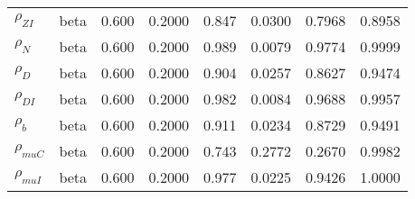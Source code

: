 \begin{center}
\begin{longtable}{llcccccc}
${\rho_{ZI}}$ & beta &   0.600 & 0.2000 &   0.847& 0.0300 &  0.7968 &  0.8958 \\ 
${\rho_N}$ & beta &   0.600 & 0.2000 &   0.989& 0.0079 &  0.9774 &  0.9999 \\ 
${\rho_D}$ & beta &   0.600 & 0.2000 &   0.904& 0.0257 &  0.8627 &  0.9474 \\ 
${\rho_{DI}}$ & beta &   0.600 & 0.2000 &   0.982& 0.0084 &  0.9688 &  0.9957 \\ 
${\rho_b}$ & beta &   0.600 & 0.2000 &   0.911& 0.0234 &  0.8729 &  0.9491 \\ 
${\rho_{muC}}$ & beta &   0.600 & 0.2000 &   0.743& 0.2772 &  0.2670 &  0.9982 \\ 
${\rho_{muI}}$ & beta &   0.600 & 0.2000 &   0.977& 0.0225 &  0.9426 &  1.0000 \\ 
\end{longtable}
 \end{center}
